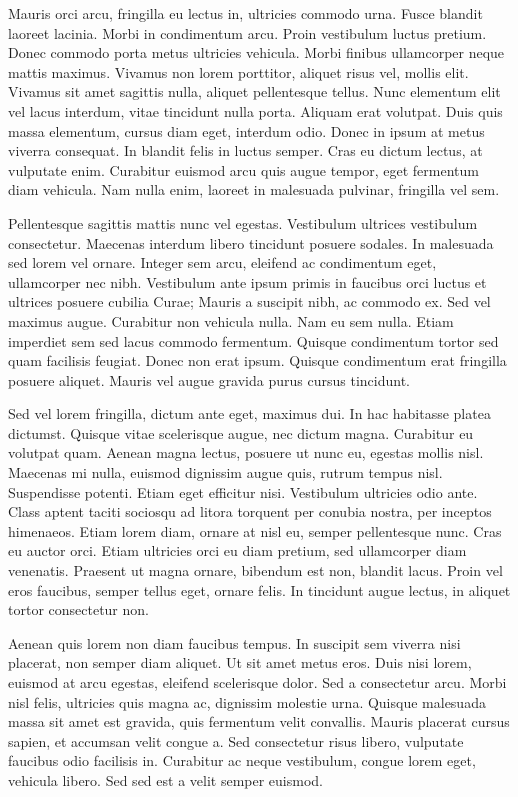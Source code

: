 \documentclass{article}
\begin{document}
	Mauris orci arcu, fringilla eu lectus in, ultricies commodo urna. Fusce blandit laoreet lacinia. Morbi in condimentum arcu. Proin vestibulum luctus pretium. Donec commodo porta metus ultricies vehicula. Morbi finibus ullamcorper neque mattis maximus. Vivamus non lorem porttitor, aliquet risus vel, mollis elit. Vivamus sit amet sagittis nulla, aliquet pellentesque tellus. Nunc elementum elit vel lacus interdum, vitae tincidunt nulla porta. Aliquam erat volutpat. Duis quis massa elementum, cursus diam eget, interdum odio. Donec in ipsum at metus viverra consequat. In blandit felis in luctus semper. Cras eu dictum lectus, at vulputate enim. Curabitur euismod arcu quis augue tempor, eget fermentum diam vehicula. Nam nulla enim, laoreet in malesuada pulvinar, fringilla vel sem.
	
	Pellentesque sagittis mattis nunc vel egestas. Vestibulum ultrices vestibulum consectetur. Maecenas interdum libero tincidunt posuere sodales. In malesuada sed lorem vel ornare. Integer sem arcu, eleifend ac condimentum eget, ullamcorper nec nibh. Vestibulum ante ipsum primis in faucibus orci luctus et ultrices posuere cubilia Curae; Mauris a suscipit nibh, ac commodo ex. Sed vel maximus augue. Curabitur non vehicula nulla. Nam eu sem nulla. Etiam imperdiet sem sed lacus commodo fermentum. Quisque condimentum tortor sed quam facilisis feugiat. Donec non erat ipsum. Quisque condimentum erat fringilla posuere aliquet. Mauris vel augue gravida purus cursus tincidunt.
	
	Sed vel lorem fringilla, dictum ante eget, maximus dui. In hac habitasse platea dictumst. Quisque vitae scelerisque augue, nec dictum magna. Curabitur eu volutpat quam. Aenean magna lectus, posuere ut nunc eu, egestas mollis nisl. Maecenas mi nulla, euismod dignissim augue quis, rutrum tempus nisl. Suspendisse potenti. Etiam eget efficitur nisi. Vestibulum ultricies odio ante. Class aptent taciti sociosqu ad litora torquent per conubia nostra, per inceptos himenaeos. Etiam lorem diam, ornare at nisl eu, semper pellentesque nunc. Cras eu auctor orci. Etiam ultricies orci eu diam pretium, sed ullamcorper diam venenatis. Praesent ut magna ornare, bibendum est non, blandit lacus. Proin vel eros faucibus, semper tellus eget, ornare felis. In tincidunt augue lectus, in aliquet tortor consectetur non.
	
	Aenean quis lorem non diam faucibus tempus. In suscipit sem viverra nisi placerat, non semper diam aliquet. Ut sit amet metus eros. Duis nisi lorem, euismod at arcu egestas, eleifend scelerisque dolor. Sed a consectetur arcu. Morbi nisl felis, ultricies quis magna ac, dignissim molestie urna. Quisque malesuada massa sit amet est gravida, quis fermentum velit convallis. Mauris placerat cursus sapien, et accumsan velit congue a. Sed consectetur risus libero, vulputate faucibus odio facilisis in. Curabitur ac neque vestibulum, congue lorem eget, vehicula libero. Sed sed est a velit semper euismod.
	
\end{document}
